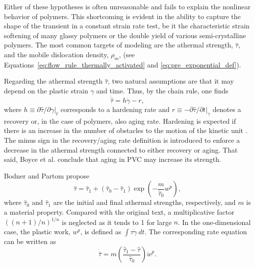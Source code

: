 Either of these hypotheses is often unreasonable and fails to explain the nonlinear behavior of polymers.
This shortcoming is evident in the ability to capture the shape of the transient in a constant strain rate test, be it the characteristic strain softening of many glassy polymers or the double yield of various semi-crystalline polymers.
The most common targets of modeling are the athermal strength, $\hat \tau$, and the mobile dislocation density, $\rho_m$, (see Equations~\eqref{eq:flow_rule_thermally_activated} and \eqref{eq:pre_exponential_def}).

Regarding the athermal strength $\hat \tau$, two natural assumptions are that it may depend on the plastic strain $\gamma$ and time.
Thus, by the chain rule, one finds
\begin{equation}
  \dot{\hat \tau} = h \dot\gamma - r,
\end{equation}
where $h\equiv \partial \hat \tau/\partial \gamma |_t$ corresponds to a hardening rate and $r\equiv - \partial \hat \tau/\partial t|_\gamma$ denotes a recovery or, in the case of polymers, also aging rate.
Hardening is expected if there is an increase in the number of obstacles to the motion of the kinetic unit \citep{kocks1975thermodynamics, hasanConstitutiveModelNonlinear1995}.
The minus sign in the recovery/aging rate definition is introduced to enforce a decrease in the athermal strength connected to either recovery or aging.
That said, Boyce et al. \citep{boyceLargeInelasticDeformation1988} conclude that aging in PVC may increase its strength.

Bodner and Partom \citep{bodnerConstitutiveEquationsElasticViscoplastic1975} propose
\begin{equation}
  \hat \tau = {\hat \tau}_1 + ({\hat \tau}_0 - {\hat \tau}_1)\exp\left(-\frac{m}{{\hat \tau}_0}w^p\right),
\end{equation}
where ${\hat \tau}_0$ and ${\hat \tau}_1$ are the initial and final athermal strengths, respectively, and $m$ is a material property.
Compared with the original text, a multiplicative factor $((n+1)/n)^{1/n}$ is neglected as it tends to 1 for large $n$.
In the one-dimensional case, the plastic work, $w^p$, is defined as $\int \tau\dot \gamma\ dt$.
The corresponding rate equation can be written as \citep{zairiElastoviscoplasticConstitutiveEquations2007}
\begin{equation}
  \label{eq:bodner_partom_rate_eq}
  \dot{\hat \tau} = m\left(\frac{{\hat \tau}_1 - {\hat \tau}}{{\hat \tau}_0}\right)\dot w^p.
\end{equation}

